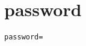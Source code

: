 \section{password}
\label{configuration:Password}
\AvailableInCsharpOnly{\TODO}
\begin{lstlisting}[style=Props,caption={Usage example for \textit{password}}]
password=
\end{lstlisting}